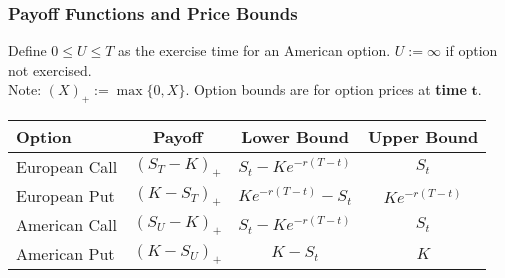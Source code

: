 \documentclass[11pt]{article}
\begin{document}
	\subsubsection{Payoff Functions and Price Bounds}
	Define \( 0\leq U\leq T \) as the exercise time for an American option. \( U:=\infty \) if option not exercised. \\Note: \( (X)_{+} := \max\{0, X\} \). Option bounds are for option prices at \textbf{time} \( \bm{t} \).
	\begin{center}
		\def\arraystretch{1.25}
		\begin{tabular}{lccc}
			\hline
			\hline
			\textbf{Option} & \textbf{Payoff} & \textbf{Lower Bound} & \textbf{Upper Bound} \\
			\hline
			European Call & \( (S_T - K)_{+} \) & \( S_t - Ke^{-r(T - t)} \) & \( S_t \)\\
			\hline
			European Put & \( (K - S_T)_{+} \) & \( Ke^{-r(T - t)} - S_t \) & \( Ke^{-r(T - t)} \) \\
			\hline
			American Call & \( (S_U - K)_{+} \) & \( S_t - Ke^{-r(T - t)} \) & \( S_t \)\\
			\hline
			American Put & \( (K - S_U)_{+} \) & \( K - S_t \) & \( K \)\\
			\hline
			\end{tabular}
		\end{center}
\end{document}
